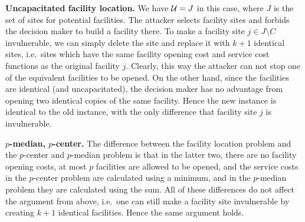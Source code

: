 \textbf{Uncapacitated facility location.} We have $\mathcal{U} = J$ in this case, where $J$ is the set of sites for potential facilities. The attacker selects facility sites and forbids the decision maker to build a facility there. 
To make a facility site $j \in J \setminus C$ invulnerable, we can simply delete the site and replace it with $k+1$ identical sites, i.e.\ sites which have the same facility opening cost and service cost functions as the original facility $j$. 
Clearly, this way the attacker can not stop one of the equivalent facilities to be opened. On the other hand, since the facilities are identical (and uncapacitated), 
the decision maker has no advantage from opening two identical copies of the same facility.
Hence the new instance is identical to the old instance, with the only difference that facility site $j$ is invulnerable.

\textbf{$p$-median, $p$-center.} The difference between the facility location problem and the $p$-center and $p$-median problem is that in the latter two, there are no facility opening costs, at most $p$ facilities are allowed to be opened, 
and the service costs in the $p$-center problem are calculated using a minimum, and in the $p$-median problem they are calculated using the sum. 
All of these differences do not affect the argument from above, i.e.\ one can still make a facility site invulnerable by creating $k+1$ identical facilities. Hence the same argument holds.

